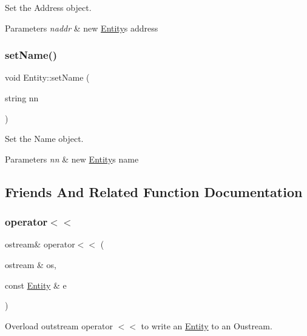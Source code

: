 Set the Address object. 


\begin{DoxyParams}{Parameters}
{\em naddr} & new \hyperlink{classEntity}{Entity}\textquotesingle{}s address \\
\hline
\end{DoxyParams}
\mbox{\label{classEntity_a6b6078942e4000e136e13aeccefba0eb}} 
\subsubsection{\texorpdfstring{set\+Name()}{setName()}}
{\footnotesize\ttfamily void Entity\+::set\+Name (\begin{DoxyParamCaption}\item[{string}]{nn }\end{DoxyParamCaption})}



Set the Name object. 


\begin{DoxyParams}{Parameters}
{\em nn} & new \hyperlink{classEntity}{Entity}\textquotesingle{}s name \\
\hline
\end{DoxyParams}


\subsection{Friends And Related Function Documentation}
\mbox{\label{classEntity_a985385a6f8478ba830ea909fc233c150}} 
\subsubsection{\texorpdfstring{operator$<$$<$}{operator<<}}
{\footnotesize\ttfamily ostream\& operator$<$$<$ (\begin{DoxyParamCaption}\item[{ostream \&}]{os,  }\item[{const \hyperlink{classEntity}{Entity} \&}]{e }\end{DoxyParamCaption})\hspace{0.3cm}{\ttfamily [friend]}}



Overload outstream operator $<$$<$ to write an \hyperlink{classEntity}{Entity} to an Oustream. 


